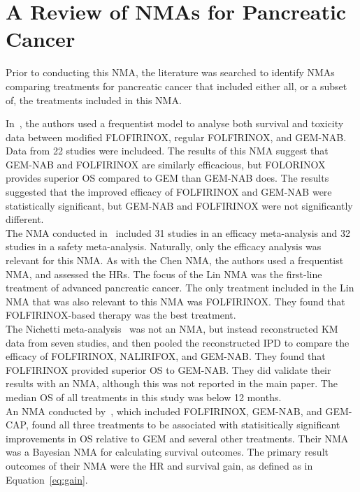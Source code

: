 \chapter{A Review of NMAs for Pancreatic Cancer}\label{litChap}

Prior to conducting this NMA, the literature was searched to identify NMAs comparing treatments for pancreatic cancer that included either all, or a subset of, the treatments included in this NMA. 

In~\cite{chen}, the authors used a frequentist model to analyse both survival and toxicity data between modified FLOFIRINOX, regular FOLFIRINOX, and GEM-NAB. Data from 22 studies were includeed. The results of this NMA suggest that GEM-NAB and FOLFIRINOX are similarly efficacious, but FOLORINOX provides superior OS compared to GEM than GEM-NAB does. The results suggested that the improved efficacy of FOLFIRINOX and GEM-NAB were statistically significant, but GEM-NAB and FOLFIRINOX were not significantly different. \\

The NMA conducted in~\cite{lin} included 31 studies in an efficacy meta-analysis and 32 studies in a safety meta-analysis. Naturally, only the efficacy analysis was relevant for this NMA. As with the Chen NMA, the authors used a frequentist NMA, and assessed the HRs. The focus of the Lin NMA was the first-line treatment of advanced pancreatic cancer. The only treatment included in the Lin NMA that was also relevant to this NMA was FOLFIRINOX. They found that FOLFIRINOX-based therapy was the best treatment. \\

The Nichetti meta-analysis~\cite{nichetti} was not an NMA, but instead reconstructed KM data from seven studies, and then pooled the reconstructed IPD to compare the efficacy of FOLFIRINOX, NALIRIFOX, and GEM-NAB. They found that FOLFIRINOX provided superior OS to GEM-NAB. They did validate their results with an NMA, although this was not reported in the main paper. The median OS of all treatments in this study was below 12 months. \\

An NMA conducted by~\cite{gresham2014}, which included FOLFIRINOX, GEM-NAB, and GEM-CAP, found all three treatments to be associated with statisitically significant improvements in OS relative to GEM and several other treatments. Their NMA was a Bayesian NMA for calculating survival outcomes. The primary result outcomes of their NMA were the HR and survival gain, as defined as in Equation~\ref{eq:gain}. 

